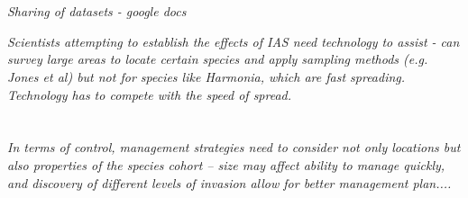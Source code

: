 \documentclass[10pt,psfig,letterpaper,twocolumn]{article}
\begin{document}
\section*{}

\emph{Sharing of datasets - google docs}

\emph{Scientists attempting to establish the effects of IAS need technology to assist - can survey large areas to locate certain species and apply sampling methods (e.g. Jones et al) but not for species like Harmonia, which are fast spreading. Technology has to compete with the speed of spread.}

\section*{}

\emph{In terms of control, management strategies need to consider not only locations but also properties of the species cohort -- size may affect ability to manage quickly, and discovery of different levels of invasion allow for better management plan....
}

\section*{}


\addtolength{\bibsep}{-2mm}
{\footnotesize
}
\end{document}
